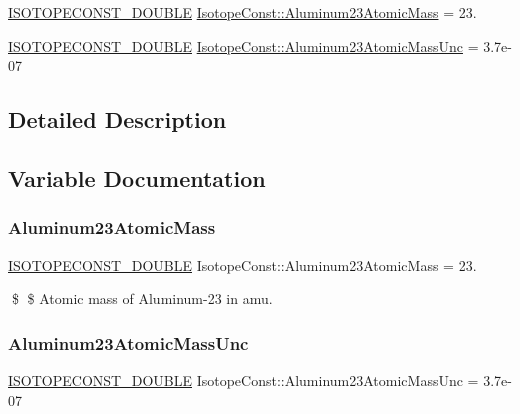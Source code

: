 \begin{DoxyCompactItemize}
\item 
\mbox{\hyperlink{group___isotope_const-_macros_ga8f45a7272ce02c0b4c65c44636ed719a}{I\+S\+O\+T\+O\+P\+E\+C\+O\+N\+S\+T\+\_\+\+D\+O\+U\+B\+LE}} \mbox{\hyperlink{group___isotope_const-_aluminum-_al23_ga96f9c7b372245482e285d7effd0348f0}{Isotope\+Const\+::\+Aluminum23\+Atomic\+Mass}} = 23.
\item 
\mbox{\hyperlink{group___isotope_const-_macros_ga8f45a7272ce02c0b4c65c44636ed719a}{I\+S\+O\+T\+O\+P\+E\+C\+O\+N\+S\+T\+\_\+\+D\+O\+U\+B\+LE}} \mbox{\hyperlink{group___isotope_const-_aluminum-_al23_ga9f19a51e9dec5a80b1d35c8640420e13}{Isotope\+Const\+::\+Aluminum23\+Atomic\+Mass\+Unc}} = 3.\+7e-\/07
\end{DoxyCompactItemize}


\subsection{Detailed Description}


\subsection{Variable Documentation}
\mbox{\label{group___isotope_const-_aluminum-_al23_ga96f9c7b372245482e285d7effd0348f0}} 
\subsubsection{\texorpdfstring{Aluminum23\+Atomic\+Mass}{Aluminum23AtomicMass}}
{\footnotesize\ttfamily \mbox{\hyperlink{group___isotope_const-_macros_ga8f45a7272ce02c0b4c65c44636ed719a}{I\+S\+O\+T\+O\+P\+E\+C\+O\+N\+S\+T\+\_\+\+D\+O\+U\+B\+LE}} Isotope\+Const\+::\+Aluminum23\+Atomic\+Mass = 23.}

\$ \$ Atomic mass of Aluminum-\/23 in amu. \mbox{\label{group___isotope_const-_aluminum-_al23_ga9f19a51e9dec5a80b1d35c8640420e13}} 
\subsubsection{\texorpdfstring{Aluminum23\+Atomic\+Mass\+Unc}{Aluminum23AtomicMassUnc}}
{\footnotesize\ttfamily \mbox{\hyperlink{group___isotope_const-_macros_ga8f45a7272ce02c0b4c65c44636ed719a}{I\+S\+O\+T\+O\+P\+E\+C\+O\+N\+S\+T\+\_\+\+D\+O\+U\+B\+LE}} Isotope\+Const\+::\+Aluminum23\+Atomic\+Mass\+Unc = 3.\+7e-\/07}


